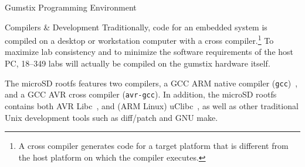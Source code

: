 \documentclass{article}
\begin{document}
\begin{section}{Gumstix Programming Environment}
		\begin{subsection}{Compilers \& Development}
			Traditionally, code for an embedded system is compiled on a desktop or
			workstation computer with a cross compiler.\footnote{A cross compiler
			generates code for a target platform that is different from the host
			platform on which the compiler executes.}  To maximize lab consistency and
			to minimize the software requirements of the host PC, 18--349 labs will
			actually be compiled on the gumstix hardware itself.

			The microSD rootfs features two compilers, a GCC ARM native compiler
			(\texttt{gcc})~\cite{FSF:GCC}, and a GCC AVR cross compiler
			(\texttt{avr-gcc}).  In addition, the microSD rootfs contains both AVR
			Libc~\cite{Roth:AVRLibc}, and (ARM Linux) uClibc~\cite{Andersen:uClibc}, as
			well as other traditional Unix development tools such as diff/patch and GNU
			make.
		\end{subsection}
	\end{section}
\end{document}

